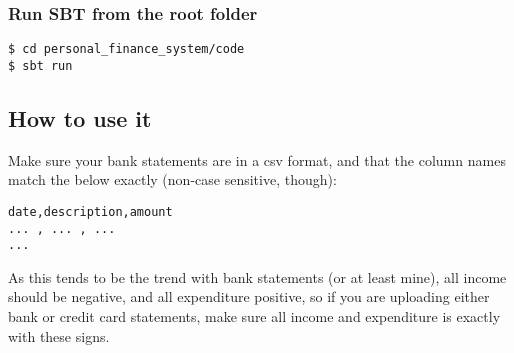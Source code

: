 \subsubsection{Run SBT from the root folder}
\begin{lstlisting}
$ cd personal_finance_system/code
$ sbt run
\end{lstlisting}


\subsection{How to use it}
Make sure your bank statements are in a csv format, and that the column names
match the below exactly (non-case sensitive, though):
\begin{lstlisting}
date,description,amount
... , ... , ...
...
\end{lstlisting}

As this tends to be the trend with bank statements (or at least mine), all
income should be negative, and all expenditure positive, so if you are
uploading either bank or credit card statements, make sure all income and
expenditure is exactly with these signs.
